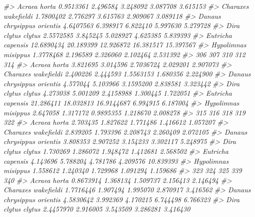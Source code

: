 \documentclass[
]{article}
\newenvironment{Shaded}{\begin{snugshade}}{\end{snugshade}}
\newcommand{\CommentTok}[1]{\textcolor[rgb]{0.56,0.35,0.01}{\textit{#1}}}
\begin{document}
\begin{Shaded}
\begin{Highlighting}[]
\CommentTok{\#\textgreater{} Acraea horta                0.9513361  2.496584  3.248092  3.087708  3.615153}
\CommentTok{\#\textgreater{} Charaxes wakefieldi         1.7800402  2.776297  3.615763  2.909067  3.089118}
\CommentTok{\#\textgreater{} Danaus chrysippus orientis  4.6407563  6.398917  6.822410  5.997630  5.279728}
\CommentTok{\#\textgreater{} Dira clytus clytus          2.5572585  3.845245  5.028927  4.625385  5.839393}
\CommentTok{\#\textgreater{} Eutricha capensis          12.6890434 20.189399 12.926872 16.381517 15.397567}
\CommentTok{\#\textgreater{} Hypolimnas misippus         1.3778468  2.196589  2.326060  2.102464  2.531392}
\CommentTok{\#\textgreater{}                                  306       307        310      312      314}
\CommentTok{\#\textgreater{} Acraea horta                3.821695  3.014596  2.7036724 2.029201 2.907073}
\CommentTok{\#\textgreater{} Charaxes wakefieldi         2.400226  2.444593  1.5563153 1.680356 2.224900}
\CommentTok{\#\textgreater{} Danaus chrysippus orientis  4.577044  5.103966  3.1595200 2.838581 3.323442}
\CommentTok{\#\textgreater{} Dira clytus clytus          4.273038  5.001209  2.4158988 1.300445 1.722051}
\CommentTok{\#\textgreater{} Eutricha capensis          21.286411 18.032813 16.9144687 6.994915 6.187004}
\CommentTok{\#\textgreater{} Hypolimnas misippus         2.647058  1.317172  0.9895355 1.218670 2.008278}
\CommentTok{\#\textgreater{}                                 315      316      318      319       322}
\CommentTok{\#\textgreater{} Acraea horta               2.703435 1.827622 1.771486 1.416612  1.057207}
\CommentTok{\#\textgreater{} Charaxes wakefieldi        2.839205 1.793396 2.208743 2.260409  2.072105}
\CommentTok{\#\textgreater{} Danaus chrysippus orientis 3.808353 2.907252 3.154233 3.302117  5.248975}
\CommentTok{\#\textgreater{} Dira clytus clytus         1.730269 1.286072 1.948472 1.412681  2.568502}
\CommentTok{\#\textgreater{} Eutricha capensis          4.143696 5.788204 4.781786 4.209576 10.839393}
\CommentTok{\#\textgreater{} Hypolimnas misippus        1.558612 1.240340 1.729968 1.091294  1.159686}
\CommentTok{\#\textgreater{}                                   323       324       325       339       340}
\CommentTok{\#\textgreater{} Acraea horta                0.8673914  1.368134  1.509737  2.156413  2.146494}
\CommentTok{\#\textgreater{} Charaxes wakefieldi         1.7716446  1.907494  1.995070  2.870917  3.416562}
\CommentTok{\#\textgreater{} Danaus chrysippus orientis  4.5830642  3.992369  4.170215  6.744498  6.766323}
\CommentTok{\#\textgreater{} Dira clytus clytus          2.4457970  2.916005  3.543509  3.286281  3.416430}

\end{Highlighting}
\end{Shaded}
\end{document}
